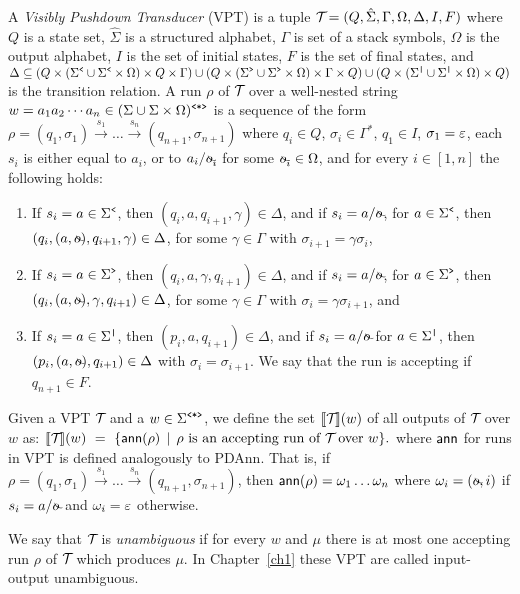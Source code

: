 A \emph{Visibly Pushdown Transducer} (VPT) is a tuple $\mathcal{T}\! = (Q, \hat{\Sigma}, \Gamma, \Omega, \Delta, I, F)$ where $Q$ is a state set, $\hat{\Sigma}$ is a structured alphabet, $\Gamma$ is set of a stack symbols, $\Omega$ is the output alphabet, $I$ is the set of initial states, $F$ is the set of final states, and 
$
%
%
%
%
%
%
\Delta \subseteq  
(Q \times (\opS \cup \opS \times \Omega) \times Q \times \Gamma)  \cup 
(Q \times (\clS \cup \clS \times \Omega) \times \Gamma \times Q)  \cup 
(Q \times (\noS \cup \noS \times \Omega) \times Q)
$
is the transition relation.
A run $\rho$ of $\mathcal{T}\!$ over a well-nested string $w = a_1 a_2\cdots a_n \in(\Sigma\cup\Sigma\times\Omega)^{\texttt{<*>}}$ %
is a sequence of the form
$
%
\rho = (q_1, \sigma_1) \xrightarrow{s_1} \ldots  \xrightarrow{s_n} (q_{n+1}, \sigma_{n+1})
$
where $q_i \in Q$, $\sigma_i\in \Gamma^{*}$, $q_1 \in I$, $\sigma_1 = \varepsilon$, each $s_i$ is either equal to $a_i$, or to $a_i/\!\oout_i$ for some $\oout_i\in\Omega$, and for every $i\in[1,n]$ the following holds:
\begin{enumerate}
  \item If $s_{i} = a\in \Sigma^{\texttt{<}}$, then $(q_i, a,q_{i+1},\gamma) \in \Delta$, and if $s_i = a/\!\oout$, for $a\in \Sigma^{\texttt{<}}$, then $(q_i, (a,\oout),q_{i+1},\gamma) \in \Delta$, for some $\gamma\in\Gamma$ with $\sigma_{i+1} = \gamma\sigma_i$,
  \item If $s_{i} = a\in\Sigma^{\texttt{>}}$, then $(q_i, a, \gamma, q_{i+1}) \in \Delta$, and if $s_i = a/\!\oout$, for $a\in \Sigma^{\texttt{>}}$, then $(q_i, (a, \oout), \gamma, q_{i+1}) \in \Delta$, for some $\gamma\in\Gamma$ with $\sigma_i = \gamma\sigma_{i+1}$, and
  \item If $s_i = a\in\Sigma^{\texttt{|}}$, then $(p_i, a,q_{i+1})\in \Delta$, and if $s_i = a/\!\oout$ for $a\in\Sigma^{\texttt{|}}$, then $(p_i, (a,\oout),q_{i+1})\in \Delta$ with $\sigma_i = \sigma_{i+1}$. We say that the run is accepting if $q_{n+1}\in F$.
\end{enumerate}
Given a VPT $\mathcal{T}\!$ and a $w \in\Sigma^{\texttt{<*>}}$, we define the set ${\llbracket{\mathcal{T}\!}\rrbracket}(w)$ of all outputs of $\mathcal{T}\!$ over $w$ as:
$
{\llbracket{\mathcal{T}\!}\rrbracket}(w) \ = \ \{ \textsf{ann}(\rho) \, \mid \, \text{$\rho$ is an accepting run of $\mathcal{T}\!$ over $w$}\}.
$
where $\textsf{ann}$ for runs in VPT is defined analogously to PDAnn. That is, if $\rho = (q_1, \sigma_1) \xrightarrow{s_1} \ldots  \xrightarrow{s_n} (q_{n+1}, \sigma_{n+1})$, then $\textsf{ann}(\rho) = \omega_1\ldots\omega_n$ where $\omega_i = (\oout, i)$ if $s_i = a/\!\oout$ and $\omega_i = \varepsilon$ otherwise.

We say that $\mathcal{T}\!$ is \emph{unambiguous} if for every $w$ and $\mu$ there is at most one accepting run $\rho$ of $\mathcal{T}\!$ which produces $\mu$. In Chapter~\ref{ch1} these VPT are called input-output unambiguous.

